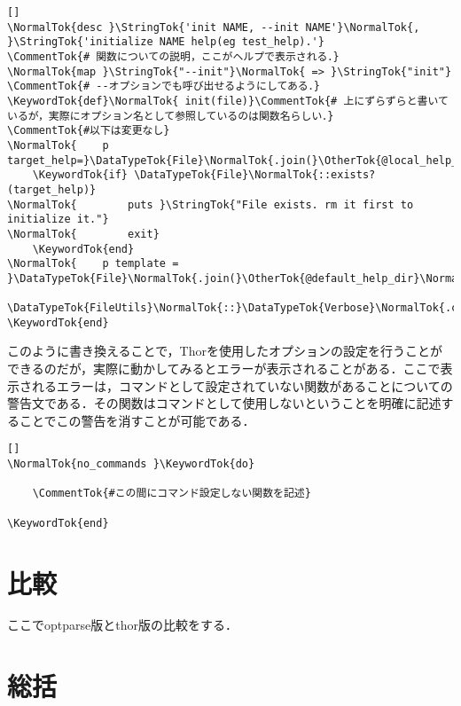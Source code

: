 \documentclass[11pt,dvipdfmx]{jsarticle}
\newcommand{\KeywordTok}[1]{\textcolor[rgb]{0.00,0.44,0.13}{\textbf{{#1}}}}
\newcommand{\DataTypeTok}[1]{\textcolor[rgb]{0.56,0.13,0.00}{{#1}}}
\newcommand{\StringTok}[1]{\textcolor[rgb]{0.25,0.44,0.63}{{#1}}}
\newcommand{\CommentTok}[1]{\textcolor[rgb]{0.38,0.63,0.69}{\textit{{#1}}}}
\newcommand{\OtherTok}[1]{\textcolor[rgb]{0.00,0.44,0.13}{{#1}}}
\newcommand{\NormalTok}[1]{{#1}}
\begin{document}
\begin{screen}
{\small
\begin{verbatim}[]
\NormalTok{desc }\StringTok{'init NAME, --init NAME'}\NormalTok{, }\StringTok{'initialize NAME help(eg test_help).'}
\CommentTok{# 関数についての説明，ここがヘルプで表示される．}
\NormalTok{map }\StringTok{"--init"}\NormalTok{ => }\StringTok{"init"}
\CommentTok{# --オプションでも呼び出せるようにしてある．}
\KeywordTok{def}\NormalTok{ init(file)}\CommentTok{# 上にずらずらと書いているが，実際にオプション名として参照しているのは関数名らしい．}
\CommentTok{#以下は変更なし}
\NormalTok{    p target_help=}\DataTypeTok{File}\NormalTok{.join(}\OtherTok{@local_help_dir}\NormalTok{,file)}
    \KeywordTok{if} \DataTypeTok{File}\NormalTok{::exists?(target_help)}
\NormalTok{        puts }\StringTok{"File exists. rm it first to initialize it."}
\NormalTok{        exit}
    \KeywordTok{end}
\NormalTok{    p template = }\DataTypeTok{File}\NormalTok{.join(}\OtherTok{@default_help_dir}\NormalTok{,}\StringTok{'template_help'}\NormalTok{)}
    \DataTypeTok{FileUtils}\NormalTok{::}\DataTypeTok{Verbose}\NormalTok{.cp(template,target_help)}
\KeywordTok{end}
\end{verbatim}}
\end{screen}

このように書き換えることで，Thorを使用したオプションの設定を行うことができるのだが，実際に動かしてみるとエラーが表示されることがある．ここで表示されるエラーは，コマンドとして設定されていない関数があることについての警告文である．その関数はコマンドとして使用しないということを明確に記述することでこの警告を消すことが可能である．

\begin{screen}
{\small
\begin{verbatim}[]
\NormalTok{no_commands }\KeywordTok{do}

    \CommentTok{#この間にコマンド設定しない関数を記述}

\KeywordTok{end}
\end{verbatim}}
\end{screen}

    \section{比較}\label{ux6bd4ux8f03}

ここでoptparse版とthor版の比較をする．

    \section{総括}\label{ux7dcfux62ec}


    
    
    
    
\end{document}
